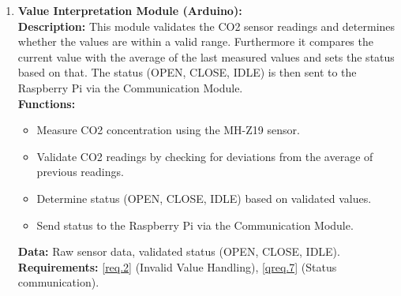 \begin{enumerate}
    \item \textbf{Value Interpretation Module (Arduino):} \\ 
        \textbf{Description:} This module validates the CO2 sensor readings and determines whether the values are within a valid range. Furthermore it compares the current value with the average of the last measured values and sets the status based on that. The status (OPEN, CLOSE, IDLE) is then sent to the Raspberry Pi via the Communication Module. \\ 
        \textbf{Functions:}
        \begin{itemize}
            \item Measure CO2 concentration using the MH-Z19 sensor.
            \item Validate CO2 readings by checking for deviations from the average of previous readings.
            \item Determine status (OPEN, CLOSE, IDLE) based on validated values.
            \item Send status to the Raspberry Pi via the Communication Module.
        \end{itemize}
        \textbf{Data:} Raw sensor data, validated status (OPEN, CLOSE, IDLE). \\ 
        \textbf{Requirements:} \ref{req.2} (Invalid Value Handling), \ref{qreq.7} (Status communication).

\end{enumerate}
\newpage
